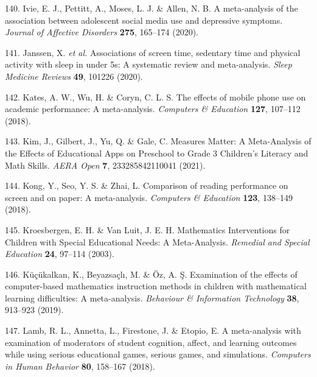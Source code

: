 \documentclass[
  english,
  man]{apa6}
\newenvironment{cslreferences}%
  {}%
  {\par}
\begin{document}
\begin{cslreferences}
\leavevmode\hypertarget{ref-ivieMetaanalysisAssociationAdolescent2020}{}%
140. Ivie, E. J., Pettitt, A., Moses, L. J. \& Allen, N. B. A meta-analysis of the association between adolescent social media use and depressive symptoms. \emph{Journal of Affective Disorders} \textbf{275}, 165--174 (2020).

\leavevmode\hypertarget{ref-janssenAssociationsScreenTime2020}{}%
141. Janssen, X. \emph{et al.} Associations of screen time, sedentary time and physical activity with sleep in under 5s: A systematic review and meta-analysis. \emph{Sleep Medicine Reviews} \textbf{49}, 101226 (2020).

\leavevmode\hypertarget{ref-katesEffectsMobilePhone2018}{}%
142. Kates, A. W., Wu, H. \& Coryn, C. L. S. The effects of mobile phone use on academic performance: A meta-analysis. \emph{Computers \& Education} \textbf{127}, 107--112 (2018).

\leavevmode\hypertarget{ref-kimMeasuresMatterMetaAnalysis2021}{}%
143. Kim, J., Gilbert, J., Yu, Q. \& Gale, C. Measures Matter: A Meta-Analysis of the Effects of Educational Apps on Preschool to Grade 3 Children's Literacy and Math Skills. \emph{AERA Open} \textbf{7}, 233285842110041 (2021).

\leavevmode\hypertarget{ref-kongComparisonReadingPerformance2018}{}%
144. Kong, Y., Seo, Y. S. \& Zhai, L. Comparison of reading performance on screen and on paper: A meta-analysis. \emph{Computers \& Education} \textbf{123}, 138--149 (2018).

\leavevmode\hypertarget{ref-kroesbergenMathematicsInterventionsChildren2003}{}%
145. Kroesbergen, E. H. \& Van Luit, J. E. H. Mathematics Interventions for Children with Special Educational Needs: A Meta-Analysis. \emph{Remedial and Special Education} \textbf{24}, 97--114 (2003).

\leavevmode\hypertarget{ref-kucukalkanExaminationEffectsComputerbased2019}{}%
146. Küçükalkan, K., Beyazsaçlı, M. \& Öz, A. Ş. Examination of the effects of computer-based mathematics instruction methods in children with mathematical learning difficulties: A meta-analysis. \emph{Behaviour \& Information Technology} \textbf{38}, 913--923 (2019).

\leavevmode\hypertarget{ref-lambMetaanalysisExaminationModerators2018}{}%
147. Lamb, R. L., Annetta, L., Firestone, J. \& Etopio, E. A meta-analysis with examination of moderators of student cognition, affect, and learning outcomes while using serious educational games, serious games, and simulations. \emph{Computers in Human Behavior} \textbf{80}, 158--167 (2018).


\end{cslreferences}
\end{document}
